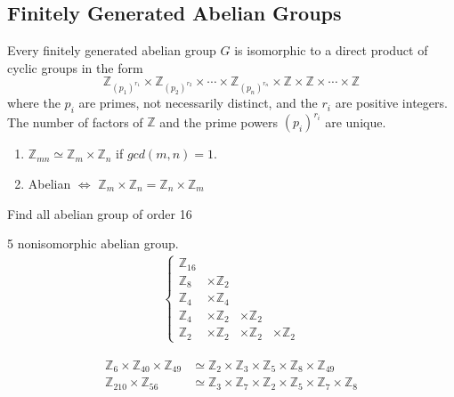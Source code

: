 \documentclass[11pt]{elegantbook}
\begin{document}
\subsection{Finitely Generated Abelian Groups}
\begin{theorem}
Every finitely generated abelian group $G$ is isomorphic to a direct product of cyclic groups in the form $$\mathbb{Z}_{(p_1)^{r_1}}\times \mathbb{Z}_{(p_2)^{r_2}}\times \cdots\times \mathbb{Z}_{(p_n)^{r_n}}\times \mathbb{Z}\times \mathbb{Z}\times \cdots \times \mathbb{Z}$$
where the $p_i$ are primes, not necessarily distinct, and the $r_i$ are positive integers. The number of factors of $\mathbb{Z}$ and the prime powers $(p_i)^{r_i}$ are unique.
\end{theorem}
\begin{enumerate}[$\bullet$]
    \item $\mathbb{Z}_{mn}\simeq \mathbb{Z}_m\times \mathbb{Z}_n$ if $gcd(m,n)=1$.
    \item Abelian $\Leftrightarrow$ $\mathbb{Z}_m\times \mathbb{Z}_n=\mathbb{Z}_n\times \mathbb{Z}_m$
\end{enumerate}



\begin{example}
Find all abelian group of order 16
\end{example}
5 nonisomorphic abelian group.
\begin{equation}
    \begin{aligned}
        \left\{\begin{matrix}
            \mathbb{Z}_{16}&&&\\
            \mathbb{Z}_8&\times \mathbb{Z}_2&&\\
            \mathbb{Z}_4&\times\mathbb{Z}_4&&\\
            \mathbb{Z}_4&\times \mathbb{Z}_2&\times \mathbb{Z}_2&\\
            \mathbb{Z}_2&\times \mathbb{Z}_2&\times \mathbb{Z}_2&\times \mathbb{Z}_2
        \end{matrix}\right.
    \end{aligned}
    \nonumber
\end{equation}
\begin{example}
\end{example}
\begin{equation}
    \begin{aligned}
        \mathbb{Z}_{6}\times \mathbb{Z}_{40}\times \mathbb{Z}_{49}&\simeq \mathbb{Z}_2\times \mathbb{Z}_3\times \mathbb{Z}_5\times \mathbb{Z}_8\times \mathbb{Z}_{49}\\
        \mathbb{Z}_{210}\times \mathbb{Z}_{56}&\simeq \mathbb{Z}_3\times \mathbb{Z}_7\times \mathbb{Z}_2\times \mathbb{Z}_5\times \mathbb{Z}_{7}\times \mathbb{Z}_{8}\\
    \end{aligned}
    \nonumber
\end{equation}
\end{document}
